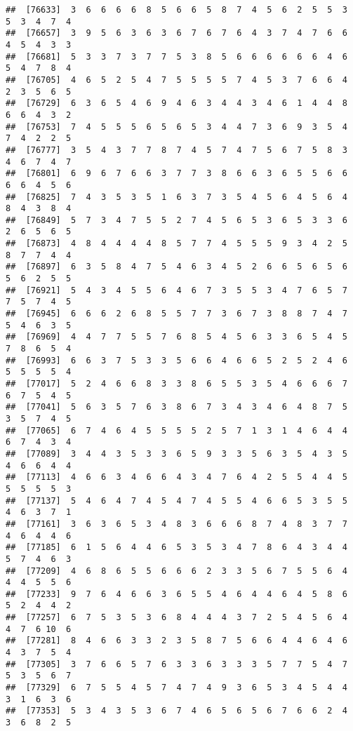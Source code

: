 \documentclass[
]{book}
\begin{document}
\begin{verbatim}
##  [76633]  3  6  6  6  6  8  5  6  6  5  8  7  4  5  6  2  5  5  3  5  3  4  7  4
##  [76657]  3  9  5  6  3  6  3  6  7  6  7  6  4  3  7  4  7  6  6  4  5  4  3  3
##  [76681]  5  3  3  7  3  7  7  5  3  8  5  6  6  6  6  6  6  4  6  5  4  7  8  4
##  [76705]  4  6  5  2  5  4  7  5  5  5  5  7  4  5  3  7  6  6  4  2  3  5  6  5
##  [76729]  6  3  6  5  4  6  9  4  6  3  4  4  3  4  6  1  4  4  8  6  6  4  3  2
##  [76753]  7  4  5  5  5  6  5  6  5  3  4  4  7  3  6  9  3  5  4  7  4  2  2  5
##  [76777]  3  5  4  3  7  7  8  7  4  5  7  4  7  5  6  7  5  8  3  4  6  7  4  7
##  [76801]  6  9  6  7  6  6  3  7  7  3  8  6  6  3  6  5  5  6  6  6  6  4  5  6
##  [76825]  7  4  3  5  3  5  1  6  3  7  3  5  4  5  6  4  5  6  4  8  4  3  8  4
##  [76849]  5  7  3  4  7  5  5  2  7  4  5  6  5  3  6  5  3  3  6  2  6  5  6  5
##  [76873]  4  8  4  4  4  4  8  5  7  7  4  5  5  5  9  3  4  2  5  8  7  7  4  4
##  [76897]  6  3  5  8  4  7  5  4  6  3  4  5  2  6  6  5  6  5  6  5  6  2  5  5
##  [76921]  5  4  3  4  5  5  6  4  6  7  3  5  5  3  4  7  6  5  7  7  5  7  4  5
##  [76945]  6  6  6  2  6  8  5  5  7  7  3  6  7  3  8  8  7  4  7  5  4  6  3  5
##  [76969]  4  4  7  7  5  5  7  6  8  5  4  5  6  3  3  6  5  4  5  7  8  6  5  4
##  [76993]  6  6  3  7  5  3  3  5  6  6  4  6  6  5  2  5  2  4  6  5  5  5  5  4
##  [77017]  5  2  4  6  6  8  3  3  8  6  5  5  3  5  4  6  6  6  7  6  7  5  4  5
##  [77041]  5  6  3  5  7  6  3  8  6  7  3  4  3  4  6  4  8  7  5  3  5  7  4  5
##  [77065]  6  7  4  6  4  5  5  5  5  2  5  7  1  3  1  4  6  4  4  6  7  4  3  4
##  [77089]  3  4  4  3  5  3  3  6  5  9  3  3  5  6  3  5  4  3  5  4  6  6  4  4
##  [77113]  4  6  6  3  4  6  6  4  3  4  7  6  4  2  5  5  4  4  5  5  5  5  5  3
##  [77137]  5  4  6  4  7  4  5  4  7  4  5  5  4  6  6  5  3  5  5  4  6  3  7  1
##  [77161]  3  6  3  6  5  3  4  8  3  6  6  6  8  7  4  8  3  7  7  4  6  4  4  6
##  [77185]  6  1  5  6  4  4  6  5  3  5  3  4  7  8  6  4  3  4  4  5  7  4  6  3
##  [77209]  4  6  8  6  5  5  6  6  6  2  3  3  5  6  7  5  5  6  4  4  4  5  5  6
##  [77233]  9  7  6  4  6  6  3  6  5  5  4  6  4  4  6  4  5  8  6  5  2  4  4  2
##  [77257]  6  7  5  3  5  3  6  8  4  4  4  3  7  2  5  4  5  6  4  4  7  6 10  6
##  [77281]  8  4  6  6  3  3  2  3  5  8  7  5  6  6  4  4  6  4  6  4  3  7  5  4
##  [77305]  3  7  6  6  5  7  6  3  3  6  3  3  3  5  7  7  5  4  7  5  3  5  6  7
##  [77329]  6  7  5  5  4  5  7  4  7  4  9  3  6  5  3  4  5  4  4  3  1  6  3  6
##  [77353]  5  3  4  3  5  3  6  7  4  6  5  6  5  6  7  6  6  2  4  3  6  8  2  5

\end{verbatim}
\end{document}
